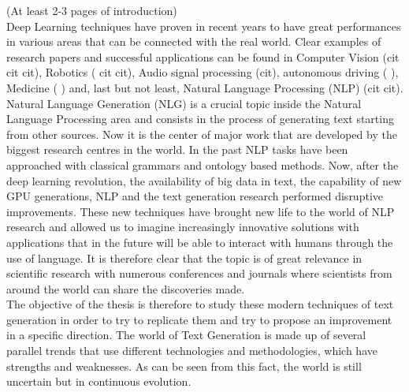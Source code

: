 (At least 2-3 pages of introduction) \\

Deep Learning techniques have proven in recent years to have great performances in various areas that can be connected with the real world. Clear examples of research papers and successful applications can be found in Computer Vision (cit cit cit), Robotics (\cite{Lillicrap} cit cit), Audio signal processing (cit), autonomous driving (\cite{ChenAutonomousDriving} \cite{AutonomousDriving2}), Medicine (\cite{Medicine} ) and, last but not least, Natural Language Processing (NLP) (cit cit). \\
Natural Language Generation (NLG) is a crucial topic inside the Natural Language Processing area and consists in the process of generating text starting from other sources. Now it is the center of major work that are developed by the biggest research centres in the world. In the past NLP tasks have been approached with classical grammars and ontology based methods. Now, after the deep learning revolution, the availability of big data in text, the capability of new GPU generations, NLP and the text generation research performed disruptive improvements. These new techniques have brought new life to the world of NLP research and allowed us to imagine increasingly innovative solutions with applications that in the future will be able to interact with humans through the use of language. 
It is therefore clear that the topic is of great relevance in scientific research with numerous conferences and journals where scientists from around the world can share the discoveries made. \\
The objective of the thesis is therefore to study these modern techniques of text generation in order to try to replicate them and try to propose an improvement in a specific direction. The world of Text Generation is made up of several parallel trends that use different technologies and methodologies, which have strengths and weaknesses. As can be seen from this fact, the world is still uncertain but in continuous evolution.

